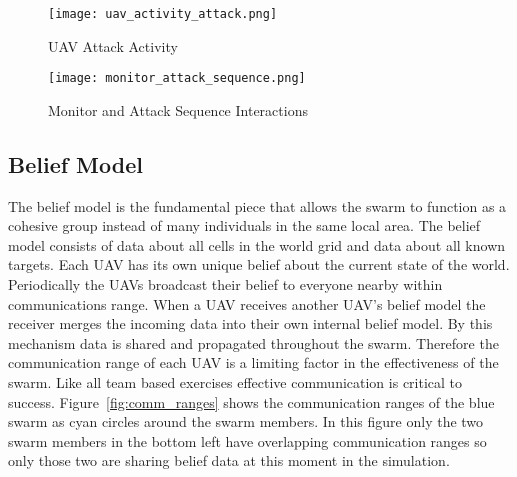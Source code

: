\begin{figure}[H]
	\centering
	\texttt{[image: uav\_activity\_attack.png]}
	\caption{UAV Attack Activity}
	\label{fig:uavAttackActivity}
\end{figure}

\begin{figure}[H]
	\centering
	\texttt{[image: monitor\_attack\_sequence.png]}
	\caption{Monitor and Attack Sequence Interactions}
	\label{fig:monitorAttacKSequence}
\end{figure}

\newpage
\clearpage

\begin{multicols*}{2}


\section{Belief Model}
\label{sec:uavBelief}
The belief model is the fundamental piece that allows the swarm to function as a cohesive group instead of many individuals in the same local area.  The belief model consists of data about all cells in the world grid and data about all known targets.  Each UAV has its own unique belief about the current state of the world.  Periodically the UAVs broadcast their belief to everyone nearby within communications range.  When a UAV receives another UAV's belief model the receiver merges the incoming data into their own internal belief model.  By this mechanism data is shared and propagated throughout the swarm.  Therefore the communication range of each UAV is a limiting factor in the effectiveness of the swarm.  Like all team based exercises effective communication is critical to success.  Figure~\ref{fig:comm_ranges} shows the communication ranges of the blue swarm as cyan circles around the swarm members.  In this figure only the two swarm members in the bottom left have overlapping communication ranges so only those two are sharing belief data at this moment in the simulation.




\end{multicols*}
